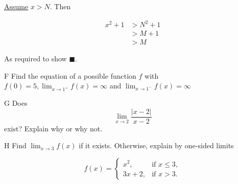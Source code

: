 \documentclass[]{article}
\begin{document}
\underline{Assume} $x > N$. Then

\begin{align*}
    x^2 + 1 & > N^2 + 1 \\
    & > M+1 \\
    & > M
\end{align*}

As required to show $\blacksquare$.

\begin{question}{F}
    Find the equation of a possible function $f$ with $f(0) = 5, \displaystyle{\lim_{x\to1^+}} f(x) = \infty$ and $\displaystyle{\lim_{x\to1^-}} f(x) = \infty$
\end{question}

\begin{question}{G}
    Does
    \[
    \lim_{x \to 2} \frac{|x-2|}{x-2}
    \]
    exist? Explain why or why not.  
\end{question}


\begin{question}{H}
    Find $\displaystyle{\lim_{x\to 3}} f(x)$ if it exists. Otherwise, explain by one-sided limits
    
    \[
        f(x) =
        \begin{cases}
            x^2, & \text{if } x \leq 3, \\
            3x + 2, & \text{if } x > 3.
        \end{cases}
    \]

\end{question}
\end{document}
